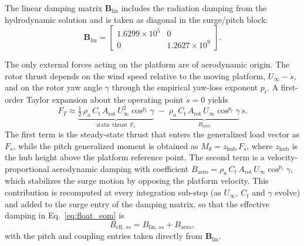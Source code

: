 \documentclass[final,5p,times,twocolumn]{elsarticle}
\begin{document}
The linear damping matrix $\mathbf{B}_{\mathrm{lin}}$ includes the radiation damping from the hydrodynamic solution and is taken as diagonal in the surge/pitch block:
%
\begin{equation}
\mathbf{B}_{\mathrm{lin}} =
\begin{bmatrix}
1.6299\times10^{5} & 0 \\
0 & 1.2627\times10^{9}
\end{bmatrix}.
\end{equation}

 
The only external forces acting on the platform are of aerodynamic origin. The rotor thrust depends on the wind speed relative to the moving platform, $U_{\infty}-\dot{s}$, and on the rotor yaw angle $\gamma$ through the empirical yaw-loss exponent $p_t$. A first-order Taylor expansion about the operating point $\dot{s}=0$ yields
%
\begin{equation}
\label{eq:float_thrust_lin}
F_{T} \approx
\underbrace{\tfrac{1}{2}\,\rho_{a}\,C_{t}\,A_{\mathrm{rot}}\,
U_{\infty}^{2}\cos^{p_t}\!\gamma}_{\text{static thrust } F_{s}}
\;-\;
\underbrace{\rho_{a}\,C_{t}\,A_{\mathrm{rot}}\,U_{\infty}\cos^{p_t}\!\gamma}
_{\textstyle B_{\mathrm{aero}}}\,\dot{s}.
\end{equation}
%
The first term is the steady-state thrust that enters the generalized load vector as $F_s$, while the pitch generalized moment is obtained as $M_{\theta} = z_{\mathrm{hub}}\,F_s$, where $z_{\mathrm{hub}}$ is the hub height above the platform reference point. The second term is a velocity-proportional aerodynamic damping with coefficient $B_{\mathrm{aero}} = \rho_{a}\,C_{t}\,A_{\mathrm{rot}}\,U_{\infty}\cos^{p_t}\!\gamma$, which stabilizes the surge motion by opposing the platform velocity. This contribution is recomputed at every integration sub-step (as $U_\infty$, $C_t$ and $\gamma$ evolve) and added to the surge entry of the damping matrix, so that the effective damping in Eq.~\eqref{eq:float_eom} is
%
\begin{equation}
\label{eq:float_beff}
B_{\mathrm{eff},\,ss} =
B_{\mathrm{lin},\,ss}
+ B_{\mathrm{aero}},
\end{equation}
%
with the pitch and coupling entries taken directly from $\mathbf{B}_{\mathrm{lin}}$.
 
 
\end{document}
